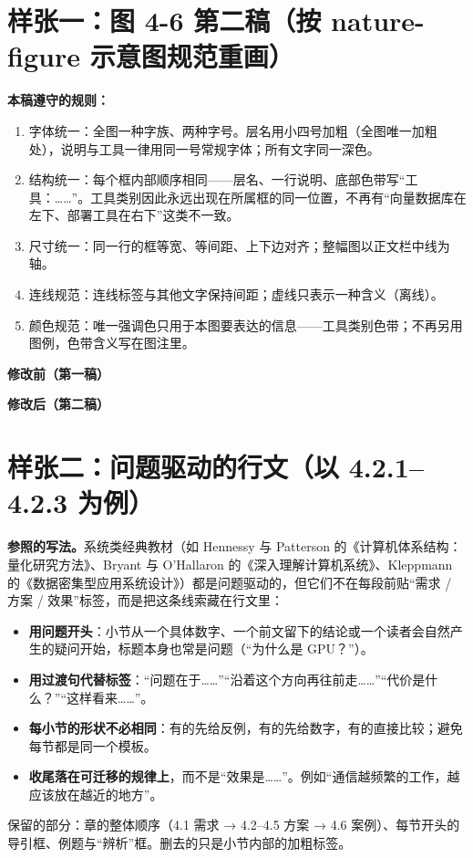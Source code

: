 \documentclass[UTF8,fontset=none,zihao=5,twoside,openany]{ctexbook}
\begin{document}
\section*{样张一：图 4-6 第二稿（按 nature-figure 示意图规范重画）}
\textbf{本稿遵守的规则：}
\begin{enumerate}
  \item 字体统一：全图一种字族、两种字号。层名用小四号加粗（全图唯一加粗处），说明与工具一律用同一号常规字体；所有文字同一深色。
  \item 结构统一：每个框内部顺序相同——层名、一行说明、底部色带写“工具：……”。工具类别因此永远出现在所属框的同一位置，不再有“向量数据库在左下、部署工具在右下”这类不一致。
  \item 尺寸统一：同一行的框等宽、等间距、上下边对齐；整幅图以正文栏中线为轴。
  \item 连线规范：连线标签与其他文字保持间距；虚线只表示一种含义（离线）。
  \item 颜色规范：唯一强调色只用于本图要表达的信息——工具类别色带；不再另用图例，色带含义写在图注里。
\end{enumerate}

\Needspace{80mm}\noindent\textbf{修改前（第一稿）}

\Needspace{80mm}\noindent\textbf{修改后（第二稿）}


\clearpage
\section*{样张二：问题驱动的行文（以 4.2.1--4.2.3 为例）}
\textbf{参照的写法。}系统类经典教材（如 Hennessy 与 Patterson 的《计算机体系结构：量化研究方法》、Bryant 与 O'Hallaron 的《深入理解计算机系统》、Kleppmann 的《数据密集型应用系统设计》）都是问题驱动的，但它们不在每段前贴“需求 / 方案 / 效果”标签，而是把这条线索藏在行文里：
\begin{itemize}
  \item \textbf{用问题开头}：小节从一个具体数字、一个前文留下的结论或一个读者会自然产生的疑问开始，标题本身也常是问题（“为什么是 GPU？”）。
  \item \textbf{用过渡句代替标签}：“问题在于……”“沿着这个方向再往前走……”“代价是什么？”“这样看来……”。
  \item \textbf{每小节的形状不必相同}：有的先给反例，有的先给数字，有的直接比较；避免每节都是同一个模板。
  \item \textbf{收尾落在可迁移的规律上}，而不是“效果是……”。例如“通信越频繁的工作，越应该放在越近的地方”。
\end{itemize}
保留的部分：章的整体顺序（4.1 需求 → 4.2--4.5 方案 → 4.6 案例）、每节开头的导引框、例题与“辨析”框。删去的只是小节内部的加粗标签。
\end{document}
